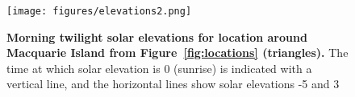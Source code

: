 \documentclass[10pt]{article}
\begin{document}
\begin{figure}[htbp]
  \begin{center}
\texttt{[image: figures/elevations2.png]}
\end{center}
\caption{
{\bf Morning twilight solar elevations for location around
  Macquarie Island from Figure~\ref{fig:locations} (triangles).} The
  time at which solar elevation is 0 (sunrise) is indicated
  with a vertical line, and the horizontal lines show solar elevations
  -5 and 3}
  \label{fig:elevations2}
\end{figure}
\end{document}
